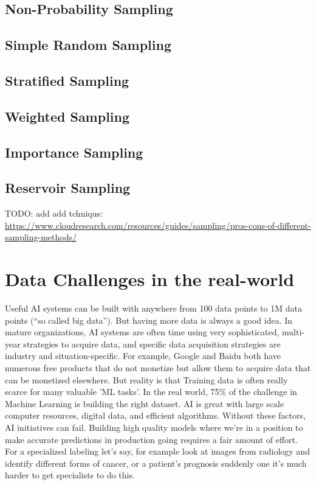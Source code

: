 \documentclass[openany]{book}
\begin{document}
\subsection{Non-Probability Sampling}
\subsection{Simple Random Sampling}
\subsection{Stratified Sampling	}
\subsection{Weighted Sampling}
\subsection{Importance Sampling	}
\subsection{Reservoir Sampling}




TODO: add 
add tchniqus: \url{https://www.cloudresearch.com/resources/guides/sampling/pros-cons-of-different-sampling-methods/}






\section{Data Challenges in the real-world}
Useful AI systems can be built with anywhere from 100 data points to 1M data points (``so called big data''). But having more data is always a good idea. In mature organizations, AI systems are often time using very sophisticated, multi-year strategies to acquire data, and specific data acquisition strategies are industry and situation-specific. For example, Google and Baidu both have numerous free products that do not monetize but allow them to acquire data that can be monetized elsewhere. But reality is that Training data is often really scarce for many valuable 'ML tasks'. In the real world, 75\% of the challenge in Machine Learning is building the right dataset. AI is great with large scale computer resources, digital data, and efficient algorithms. Without these factors, AI initiatives can fail.  Building high quality models where we're in a position to make accurate predictions in production  going requires a fair amount of effort. For a specialized labeling let's say, for example look at images from radiology and identify different forms of cancer, or a patient's prognosis suddenly one it's much harder to get specialists to do this.
\end{document}
